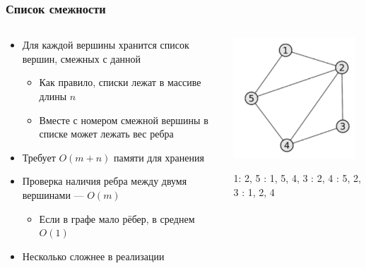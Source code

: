 \documentclass[xetex,mathserif,serif]{beamer}
\begin{document}
	\begin{frame}
		\frametitle{Список смежности}
		\begin{columns}
			\begin{column}{0.65\textwidth}
				\begin{itemize}
					\item Для каждой вершины хранится список вершин, смежных с данной
					\begin{itemize}
						\item Как правило, списки лежат в массиве длины $n$
						\item Вместе с номером смежной вершины в списке может лежать вес ребра
					\end{itemize}
					\item Требует $O(m + n)$ памяти для хранения
					\item Проверка наличия ребра между двумя вершинами --- $O(m)$
					\begin{itemize}
						\item Если в графе мало рёбер, в среднем $O(1)$
					\end{itemize}
					\item Несколько сложнее в реализации
				\end{itemize}
			\end{column}
			\begin{column}{0.35\textwidth}
				\begin{center}
					\includegraphics[width=0.95\textwidth]{adjacency-list.png}
				\end{center}
				1: 2, 5 : 1, 5, 4, 3 : 2, 4 : 5, 2, 3 : 1, 2, 4
			\end{column}
		\end{columns}
	\end{frame}
\end{document}

